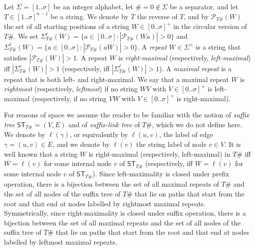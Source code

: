 \documentclass[a4paper,UKenglish]{lipics-v2016}
\newcommand{\REV}[1]{\ensuremath{\overline{#1}}}
\newcommand{\ST}{\ensuremath{\mathsf{ST}}}
\begin{document}
Let $\Sigma = [1..\sigma]$ be an integer alphabet, let $\# = 0 \notin \Sigma$ be a separator, and let $T \in [1..\sigma]^{n-1}$ be a string. We denote by $\overline{T}$ the reverse of $T$, and by $\mathcal{P}_{T\#}(W)$ the set of all starting positions of a string $W \in [0..\sigma]^+$ in the circular version of $T\#$. We set $\Sigma^{r}_{T\#}(W)=\{a \in [0..\sigma] : |\mathcal{P}_{T\#}(Wa)|>0 \}$ and  $\Sigma^{\ell}_{T\#}(W)=\{a \in [0..\sigma] : |\mathcal{P}_{T\#}(aW)|>0 \}$. A \emph{repeat} $W \in \Sigma^+$ is a string that satisfies $|\mathcal{P}_{T\#}(W)|>1$. A repeat $W$ is \emph{right-maximal} (respectively, \emph{left-maximal}) iff $|\Sigma^{r}_{T\#}(W)|>1$ (respectively, iff $|\Sigma^{\ell}_{T\#}(W)|>1$). A \emph{maximal repeat} is a repeat that is both left- and right-maximal. We say that a maximal repeat $W$ is \emph{rightmost} (respectively, \emph{leftmost}) if no string $WV$ with $V \in [0..\sigma]^+$ is left-maximal (respectively, if no string $VW$ with $V \in [0..\sigma]^+$ is right-maximal).

For reasons of space we assume the reader to be familiar with the notion of \emph{suffix tree} $\ST_{T\#} = (V,E)$ and of \emph{suffix-link tree} of $T\#$, which we do not define here. We denote by $\ell(\gamma)$, or equivalently by $\ell(u,v)$, the label of edge $\gamma=(u,v) \in E$, and we denote by $\ell(v)$ the string label of node $v \in V$. It is well known that a string $W$ is right-maximal (respectively, left-maximal) in $T\#$ iff $W=\ell(v)$ for some internal node $v$ of $\ST_{T\#}$ (respectively, iff $W=\REV{\ell(v)}$ for some internal node $v$ of $\ST_{\REV{T}\#}$). Since left-maximality is closed under prefix operation, there is a bijection between the set of all maximal repeats of $T\#$ and the set of all nodes of the suffix tree of $T\#$ that lie on paths that start from the root and that end at nodes labelled by rightmost maximal repeats. Symmetrically, since right-maximality is closed under suffix operation, there is a bijection between the set of all maximal repeats and the set of all nodes of the suffix tree of $\REV{T}\#$ that lie on paths that start from the root and that end at nodes labelled by leftmost maximal repeats.
\end{document}
